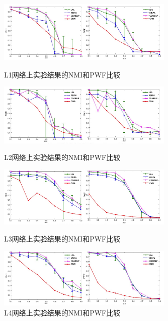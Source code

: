 \begin{figure}
  \centering
  \includegraphics[width=0.75\textwidth]{figures/S1deNMIhePWF}
  \caption{L1网络上实验结果的NMI和PWF比较}\label{fig:S1deNMIhePWF}

  \includegraphics[width=0.75\textwidth]{figures/S2deNMIhePWF}
  \caption{L2网络上实验结果的NMI和PWF比较}\label{fig:S2deNMIhePWF}

  \includegraphics[width=0.75\textwidth]{figures/S3deNMIhePWF}
  \caption{L3网络上实验结果的NMI和PWF比较}\label{fig:S3deNMIhePWF}

  \includegraphics[width=0.75\textwidth]{figures/S4deNMIhePWF}
  \caption{L4网络上实验结果的NMI和PWF比较}\label{fig:S4deNMIhePWF}
\end{figure}

